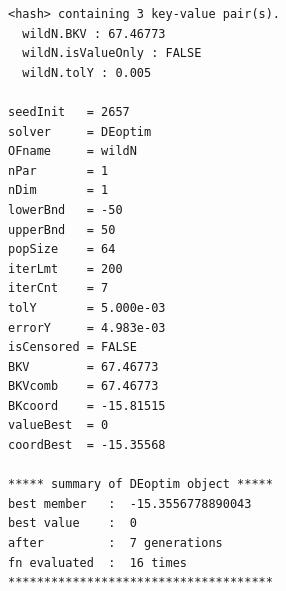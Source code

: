 \documentclass[11pt, oneside]{article}
\begin{document}
\pagebreak

\begin{verbatim} 
<hash> containing 3 key-value pair(s).
  wildN.BKV : 67.46773
  wildN.isValueOnly : FALSE
  wildN.tolY : 0.005

seedInit   = 2657 
solver     = DEoptim 
OFname     = wildN 
nPar       = 1 
nDim       = 1 
lowerBnd   = -50 
upperBnd   = 50 
popSize    = 64 
iterLmt    = 200 
iterCnt    = 7 
tolY       = 5.000e-03 
errorY     = 4.983e-03 
isCensored = FALSE 
BKV        = 67.46773 
BKVcomb    = 67.46773 
BKcoord    = -15.81515 
valueBest  = 0 
coordBest  = -15.35568 

***** summary of DEoptim object ***** 
best member   :  -15.3556778890043 
best value    :  0 
after         :  7 generations 
fn evaluated  :  16 times 
*************************************

 \end{verbatim}
   
   
\end{document}
